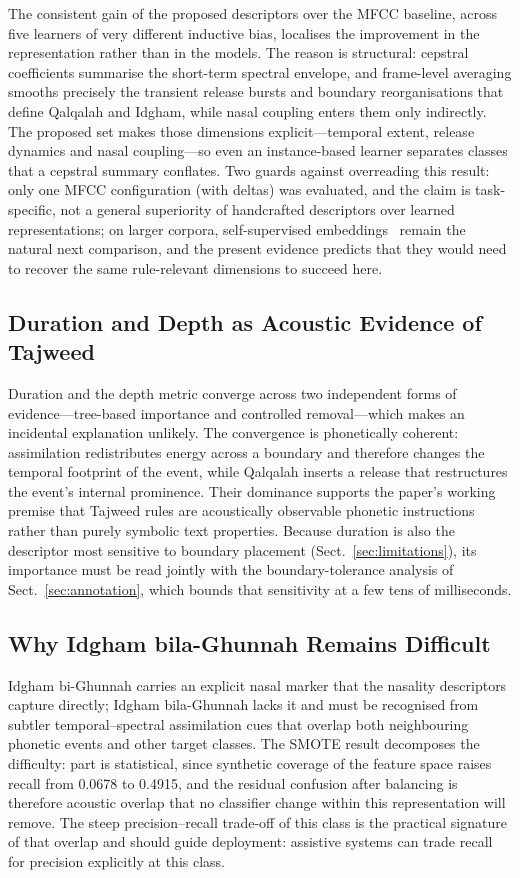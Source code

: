 \documentclass[runningheads]{llncs}
\begin{document}
The consistent gain of the proposed descriptors over the MFCC baseline, across
five learners of very different inductive bias, localises the improvement in
the representation rather than in the models. The reason is structural: cepstral
coefficients summarise the short-term spectral envelope, and frame-level
averaging smooths precisely the transient release bursts and boundary
reorganisations that define Qalqalah and Idgham, while nasal coupling enters
them only indirectly. The proposed set makes those dimensions explicit---temporal
extent, release dynamics and nasal coupling---so even an instance-based learner
separates classes that a cepstral summary conflates. Two guards against
overreading this result: only one MFCC configuration (with deltas) was evaluated,
and the claim is task-specific, not a general superiority of handcrafted
descriptors over learned representations; on larger corpora, self-supervised
embeddings~\cite{baevski2020wav2vec,radford2023whisper} remain the natural next
comparison, and the present evidence predicts that they would need to recover
the same rule-relevant dimensions to succeed here.

\subsection{Duration and Depth as Acoustic Evidence of Tajweed}

Duration and the depth metric converge across two independent forms of
evidence---tree-based importance and controlled removal---which makes an
incidental explanation unlikely. The convergence is phonetically coherent:
assimilation redistributes energy across a boundary and therefore changes the
temporal footprint of the event, while Qalqalah inserts a release that
restructures the event's internal prominence. Their dominance supports the
paper's working premise that Tajweed rules are acoustically observable phonetic
instructions rather than purely symbolic text properties. Because duration is
also the descriptor most sensitive to boundary placement
(Sect.~\ref{sec:limitations}), its importance must be read jointly with the
boundary-tolerance analysis of Sect.~\ref{sec:annotation}, which bounds that
sensitivity at a few tens of milliseconds.

\subsection{Why Idgham bila-Ghunnah Remains Difficult}

Idgham bi-Ghunnah carries an explicit nasal marker that the nasality descriptors
capture directly; Idgham bila-Ghunnah lacks it and must be recognised from
subtler temporal--spectral assimilation cues that overlap both neighbouring
phonetic events and other target classes. The SMOTE result decomposes the
difficulty: part is statistical, since synthetic coverage of the feature space
raises recall from 0.0678 to 0.4915, and the residual confusion after balancing
is therefore acoustic overlap that no classifier change within this
representation will remove. The steep precision--recall trade-off of this class
is the practical signature of that overlap and should guide deployment:
assistive systems can trade recall for precision explicitly at this class.
\end{document}

